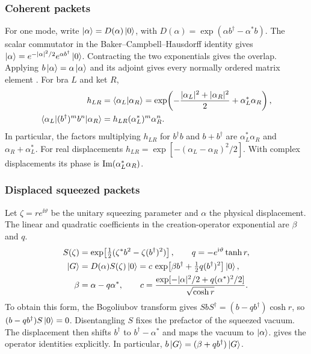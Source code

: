 \documentclass[../../main.tex]{subfiles}
\begin{document}
\subsubsection{Coherent packets}
\label{sec:coh}

For one mode, write
\(\left\lvert \alpha \right\rangle=D(\alpha)\left\lvert 0 \right\rangle\), with
\(D(\alpha)=\exp(\alpha b^\dagger-\alpha^* b)\). The scalar commutator in
the Baker--Campbell--Hausdorff identity gives
\(\left\lvert \alpha \right\rangle=e^{-|\alpha|^2/2}e^{\alpha b^\dagger}\left\lvert 0 \right\rangle\).
Contracting the two exponentials gives the overlap. Applying
\(b\left\lvert \alpha \right\rangle=\alpha\left\lvert \alpha \right\rangle\) and its adjoint gives every normally
ordered matrix element \cite{glauber1963}. For bra \(L\) and ket \(R\),
\begin{align}
 h_{LR} &= \left\langle \alpha_L \middle| \alpha_R \right\rangle
     = \exp\!\left(-\frac{|\alpha_L|^2+|\alpha_R|^2}{2}
                    +\alpha_L^*\alpha_R\right), \label{eq:coh-overlap}\\
 \langle \alpha_L\rvert (b^\dagger)^m b^n\lvert \alpha_R\rangle
     &= h_{LR}(\alpha_L^*)^m\alpha_R^n. \label{eq:coh-monomial}
\end{align}
In particular, the factors multiplying \(h_{LR}\) for \(b^\dagger b\)
and \(b+b^\dagger\) are \(\alpha_L^*\alpha_R\) and
\(\alpha_R+\alpha_L^*\). For real displacements
\(h_{LR}=\exp[-(\alpha_L-\alpha_R)^2/2]\).
With complex displacements its phase is
\(\operatorname{Im}(\alpha_L^*\alpha_R)\).

\subsubsection{Displaced squeezed packets}
\label{sec:sq}

Let \(\zeta=r e^{\ii\vartheta}\) be the unitary squeezing parameter and
\(\alpha\) the physical displacement. The linear and quadratic
coefficients in the creation-operator exponential are \(\beta\) and \(q\).
\begin{align}
 S(\zeta)&=\exp\!\left[\tfrac12(\zeta^* b^2-\zeta(b^\dagger)^2)\right],
 \qquad q=-e^{\mathrm{i}\vartheta}\tanh r, \label{eq:squeeze}\\
 \left\lvert G \right\rangle&=D(\alpha)S(\zeta)\left\lvert 0 \right\rangle
      =c\,\exp\!\left[\beta b^\dagger+\tfrac12 q(b^\dagger)^2\right]\left\lvert 0 \right\rangle,\\
 \beta&=\alpha-q\alpha^*, \qquad
 c=\frac{\exp[-|\alpha|^2/2+q(\alpha^*)^2/2]}{\sqrt{\cosh r}}.
 \label{eq:gaussian-state}
\end{align}
To obtain this form, the Bogoliubov transform gives
\(S b S^\dagger=(b-qb^\dagger)\cosh r\), so
\((b-qb^\dagger)S\left\lvert 0 \right\rangle=0\). Disentangling \(S\) fixes the prefactor of
the squeezed vacuum. The displacement then shifts \(b^\dagger\) to
\(b^\dagger-\alpha^*\) and maps the vacuum to \(\left\lvert \alpha \right\rangle\).
 gives the operator identities explicitly. In particular,
\(b\left\lvert G \right\rangle=(\beta+q b^\dagger)\left\lvert G \right\rangle\).
\end{document}
